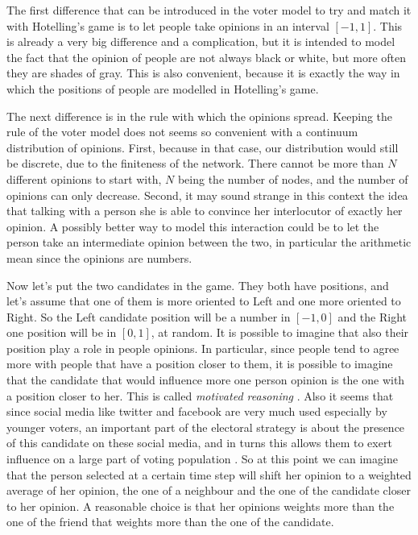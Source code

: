 \documentclass[11pt,a4paper,twocolumn]{article}
\begin{document}
The first difference that can be introduced in the voter model to try and match it with Hotelling's game is to let people take opinions in an interval $[-1,1]$. This is already a very big difference and a complication, but it is intended to model the fact that the opinion of people are not always black or white, but more often they are shades of gray. This is also convenient, because it is exactly the way in which the positions of people are modelled in Hotelling's game.

The next difference is in the rule with which the opinions spread. Keeping the rule of the voter model does not seems so convenient with a continuum distribution of opinions. First, because in that case, our distribution would still be discrete, due to the finiteness of the network. There cannot be more than $N$ different opinions to start with, $N$ being the number of nodes, and the number of opinions can only decrease. Second, it may sound strange in this context the idea that talking with a person she is able to convince her interlocutor of exactly her opinion. A possibly better way to model this interaction could be to let the person take an intermediate opinion between the two, in particular the arithmetic mean since the opinions are numbers.

Now let's put the two candidates in the game. They both have positions, and let's assume that one of them is more oriented to Left and one more oriented to Right. So the Left candidate position will be a number in $[-1,0]$ and the Right one position will be in $[0,1]$, at random. 
It is possible to imagine that also their position play a role in people opinions. In particular, since people tend to agree more with people that have a position closer to them, it is possible to imagine that the candidate that would influence more one person opinion is the one with a position closer to her. This is called \emph{motivated reasoning} \citep{Mooney2011,Kunda1990}. 
Also it seems that since social media like twitter and facebook are very much used especially by younger voters, an important part of the electoral strategy is about the presence of this candidate on these social media, and in turns this allows them to exert influence on a large part of voting population \citep{Caldarelli2014,Cha2010,Anjaria2014}.
So at this point we can imagine that the person selected at a certain time step will shift her opinion to a weighted average of her opinion, the one of a neighbour and the one of the candidate closer to her opinion. A reasonable choice is that her opinions weights more than the one of the friend that weights more than the one of the candidate.
\end{document}

